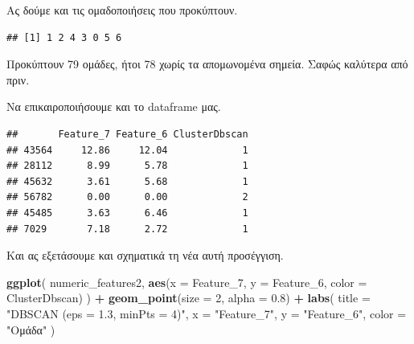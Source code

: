 \documentclass[
]{article}
\newenvironment{Shaded}{\begin{snugshade}}{\end{snugshade}}
\newcommand{\AttributeTok}[1]{\textcolor[rgb]{0.13,0.29,0.53}{#1}}
\newcommand{\DecValTok}[1]{\textcolor[rgb]{0.00,0.00,0.81}{#1}}
\newcommand{\FloatTok}[1]{\textcolor[rgb]{0.00,0.00,0.81}{#1}}
\newcommand{\FunctionTok}[1]{\textcolor[rgb]{0.13,0.29,0.53}{\textbf{#1}}}
\newcommand{\NormalTok}[1]{#1}
\newcommand{\OtherTok}[1]{\textcolor[rgb]{0.56,0.35,0.01}{#1}}
\newcommand{\SpecialCharTok}[1]{\textcolor[rgb]{0.81,0.36,0.00}{\textbf{#1}}}
\newcommand{\StringTok}[1]{\textcolor[rgb]{0.31,0.60,0.02}{#1}}
\begin{document}
Ας δούμε και τις ομαδοποιήσεις που προκύπτουν.

\begin{Shaded}
\end{Shaded}

\begin{verbatim}
## [1] 1 2 4 3 0 5 6
\end{verbatim}

Προκύπτουν 79 ομάδες, ήτοι 78 χωρίς τα απομωνομένα σημεία. Σαφώς
καλύτερα από πριν.

Να επικαιροποιήσουμε και το dataframe μας.

\begin{Shaded}
\end{Shaded}

\begin{verbatim}
##       Feature_7 Feature_6 ClusterDbscan
## 43564     12.86     12.04             1
## 28112      8.99      5.78             1
## 45632      3.61      5.68             1
## 56782      0.00      0.00             2
## 45485      3.63      6.46             1
## 7029       7.18      2.72             1
\end{verbatim}

Και ας εξετάσουμε και σχηματικά τη νέα αυτή προσέγγιση.

\begin{Shaded}
\begin{Highlighting}[]
\FunctionTok{ggplot}\NormalTok{(}
\NormalTok{  numeric\_features2,}
  \FunctionTok{aes}\NormalTok{(}\AttributeTok{x =}\NormalTok{ Feature\_7, }\AttributeTok{y =}\NormalTok{ Feature\_6, }\AttributeTok{color =}\NormalTok{ ClusterDbscan)}
\NormalTok{) }\SpecialCharTok{+}
  \FunctionTok{geom\_point}\NormalTok{(}\AttributeTok{size =} \DecValTok{2}\NormalTok{, }\AttributeTok{alpha =} \FloatTok{0.8}\NormalTok{) }\SpecialCharTok{+}
  \FunctionTok{labs}\NormalTok{(}
    \AttributeTok{title =} \StringTok{"DBSCAN (eps = 1.3, minPts = 4)"}\NormalTok{,}
    \AttributeTok{x =} \StringTok{"Feature\_7"}\NormalTok{,}
    \AttributeTok{y =} \StringTok{"Feature\_6"}\NormalTok{,}
    \AttributeTok{color =} \StringTok{"Ομάδα"}
\NormalTok{  )}
\end{Highlighting}
\end{Shaded}
\end{document}
